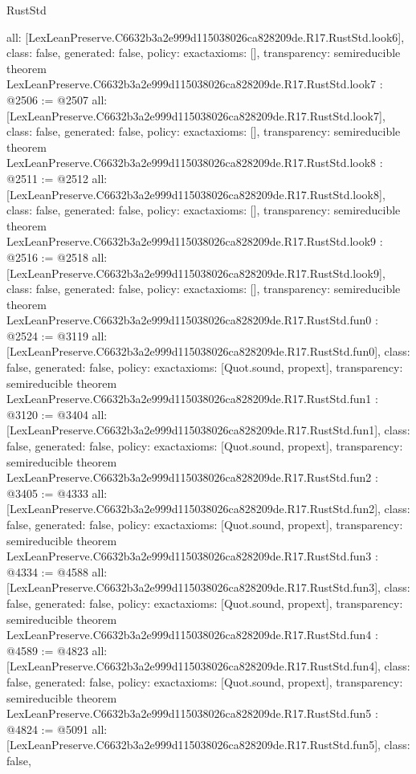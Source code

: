 \begin{lexlean}{RustStd}
\begin{coremodule}
{  all: [LexLeanPreserve.C6632b3a2e999d115038026ca828209de.R17.RustStd.look6],
  class: false,
  generated: false,
  policy: exact{axioms: []},
  transparency: semireducible
}
theorem LexLeanPreserve.C6632b3a2e999d115038026ca828209de.R17.RustStd.look7 : @2506 := @2507 {
  all: [LexLeanPreserve.C6632b3a2e999d115038026ca828209de.R17.RustStd.look7],
  class: false,
  generated: false,
  policy: exact{axioms: []},
  transparency: semireducible
}
theorem LexLeanPreserve.C6632b3a2e999d115038026ca828209de.R17.RustStd.look8 : @2511 := @2512 {
  all: [LexLeanPreserve.C6632b3a2e999d115038026ca828209de.R17.RustStd.look8],
  class: false,
  generated: false,
  policy: exact{axioms: []},
  transparency: semireducible
}
theorem LexLeanPreserve.C6632b3a2e999d115038026ca828209de.R17.RustStd.look9 : @2516 := @2518 {
  all: [LexLeanPreserve.C6632b3a2e999d115038026ca828209de.R17.RustStd.look9],
  class: false,
  generated: false,
  policy: exact{axioms: []},
  transparency: semireducible
}
theorem LexLeanPreserve.C6632b3a2e999d115038026ca828209de.R17.RustStd.fun0 : @2524 := @3119 {
  all: [LexLeanPreserve.C6632b3a2e999d115038026ca828209de.R17.RustStd.fun0],
  class: false,
  generated: false,
  policy: exact{axioms: [Quot.sound, propext]},
  transparency: semireducible
}
theorem LexLeanPreserve.C6632b3a2e999d115038026ca828209de.R17.RustStd.fun1 : @3120 := @3404 {
  all: [LexLeanPreserve.C6632b3a2e999d115038026ca828209de.R17.RustStd.fun1],
  class: false,
  generated: false,
  policy: exact{axioms: [Quot.sound, propext]},
  transparency: semireducible
}
theorem LexLeanPreserve.C6632b3a2e999d115038026ca828209de.R17.RustStd.fun2 : @3405 := @4333 {
  all: [LexLeanPreserve.C6632b3a2e999d115038026ca828209de.R17.RustStd.fun2],
  class: false,
  generated: false,
  policy: exact{axioms: [Quot.sound, propext]},
  transparency: semireducible
}
theorem LexLeanPreserve.C6632b3a2e999d115038026ca828209de.R17.RustStd.fun3 : @4334 := @4588 {
  all: [LexLeanPreserve.C6632b3a2e999d115038026ca828209de.R17.RustStd.fun3],
  class: false,
  generated: false,
  policy: exact{axioms: [Quot.sound, propext]},
  transparency: semireducible
}
theorem LexLeanPreserve.C6632b3a2e999d115038026ca828209de.R17.RustStd.fun4 : @4589 := @4823 {
  all: [LexLeanPreserve.C6632b3a2e999d115038026ca828209de.R17.RustStd.fun4],
  class: false,
  generated: false,
  policy: exact{axioms: [Quot.sound, propext]},
  transparency: semireducible
}
theorem LexLeanPreserve.C6632b3a2e999d115038026ca828209de.R17.RustStd.fun5 : @4824 := @5091 {
  all: [LexLeanPreserve.C6632b3a2e999d115038026ca828209de.R17.RustStd.fun5],
  class: false,
}
\end{coremodule}
\end{lexlean}
